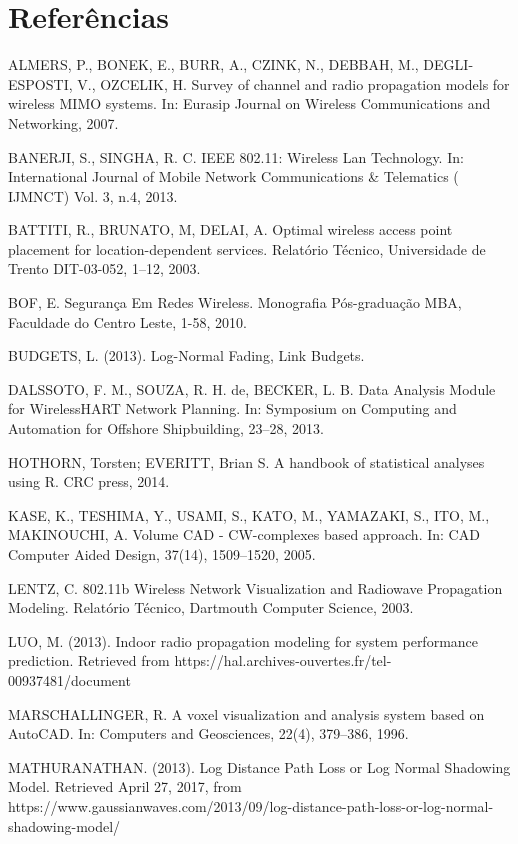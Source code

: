 \documentclass[
	12pt,				%
	openright,			%
	twoside,			%
	a4paper,			%
	english,			%
	french,				%
	spanish,			%
	brazil				%
	]{abntex2}
\begin{document}


\chapter[Referências]{Referências}

ALMERS, P., BONEK, E., BURR, A., CZINK, N., DEBBAH, M., DEGLI-ESPOSTI, V., OZCELIK, H. Survey of channel and radio propagation models for wireless MIMO systems. In: Eurasip Journal on Wireless Communications and Networking, 2007.

BANERJI, S., SINGHA, R. C. IEEE 802.11: Wireless Lan Technology. In: International Journal of Mobile Network Communications \& Telematics ( IJMNCT) Vol. 3, n.4, 2013.

BATTITI, R., BRUNATO, M, DELAI, A. Optimal wireless access point placement for location-dependent services. Relatório Técnico, Universidade de Trento DIT-03-052, 1–12, 2003. 

BOF, E. Segurança Em Redes Wireless. Monografia Pós-graduação MBA, Faculdade do Centro Leste, 1-58, 2010.

BUDGETS, L. (2013). Log-Normal Fading, Link Budgets.

DALSSOTO, F. M., SOUZA, R. H. de, BECKER, L. B. Data Analysis Module for WirelessHART Network Planning. In: Symposium on Computing and Automation for Offshore Shipbuilding, 23–28, 2013.

HOTHORN, Torsten; EVERITT, Brian S. A handbook of statistical analyses using R. CRC press, 2014.

KASE, K., TESHIMA, Y., USAMI, S., KATO, M., YAMAZAKI, S., ITO, M., MAKINOUCHI, A. Volume CAD - CW-complexes based approach. In: CAD Computer Aided Design, 37(14), 1509–1520, 2005.

LENTZ, C. 802.11b Wireless Network Visualization and Radiowave Propagation Modeling. Relatório Técnico, Dartmouth Computer Science, 2003.

LUO, M. (2013). Indoor radio propagation modeling for system performance prediction. Retrieved from https://hal.archives-ouvertes.fr/tel-00937481/document

MARSCHALLINGER, R. A voxel visualization and analysis system based on AutoCAD. In: Computers and Geosciences, 22(4), 379–386, 1996.

MATHURANATHAN. (2013). Log Distance Path Loss or Log Normal Shadowing Model. Retrieved April 27, 2017, from https://www.gaussianwaves.com/2013/09/log-distance-path-loss-or-log-normal-shadowing-model/
\end{document}
